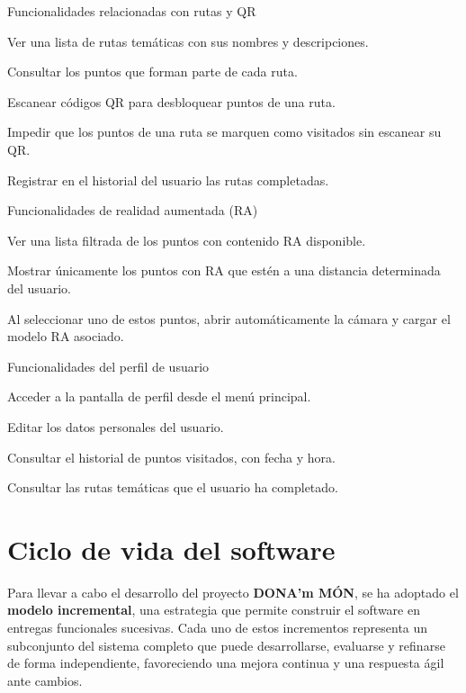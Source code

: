 \textsf{\large Funcionalidades relacionadas con rutas y QR}

\item[F33.] Ver una lista de rutas temáticas con sus nombres y descripciones.
\item[F34.] Consultar los puntos que forman parte de cada ruta.
\item[F35.] Escanear códigos QR para desbloquear puntos de una ruta.
\item[F36.] Impedir que los puntos de una ruta se marquen como visitados sin escanear su QR.
\item[F37.] Registrar en el historial del usuario las rutas completadas.

\textsf{\large Funcionalidades de realidad aumentada (RA)}

\item[F38.] Ver una lista filtrada de los puntos con contenido RA disponible.
\item[F39.] Mostrar únicamente los puntos con RA que estén a una distancia determinada del usuario.
\item[F40.] Al seleccionar uno de estos puntos, abrir automáticamente la cámara y cargar el modelo RA asociado.

\textsf{\large Funcionalidades del perfil de usuario}

\item[F41.] Acceder a la pantalla de perfil desde el menú principal.
\item[F42.] Editar los datos personales del usuario.
\item[F43.] Consultar el historial de puntos visitados, con fecha y hora.
\item[F44.] Consultar las rutas temáticas que el usuario ha completado.


\section{Ciclo de vida del software}

Para llevar a cabo el desarrollo del proyecto \textbf{DONA'm M\'ON}, se ha adoptado el \textbf{modelo incremental}, una estrategia que permite construir el software en entregas funcionales sucesivas. Cada uno de estos incrementos representa un subconjunto del sistema completo que puede desarrollarse, evaluarse y refinarse de forma independiente, favoreciendo una mejora continua y una respuesta ágil ante cambios.

